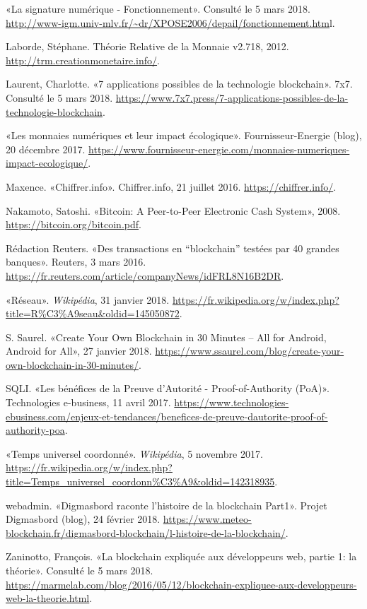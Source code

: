 \documentclass{article}
\begin{document}
«La signature numérique - Fonctionnement». Consulté le 5 mars 2018. \url{http://www-igm.univ-mlv.fr/~dr/XPOSE2006/depail/fonctionnement.htm}l.

Laborde, Stéphane. Théorie Relative de la Monnaie v2.718, 2012. \url{http://trm.creationmonetaire.info/}.

Laurent, Charlotte. «7 applications possibles de la technologie blockchain». 7x7. Consulté le 5 mars 2018. \url{https://www.7x7.press/7-applications-possibles-de-la-technologie-blockchain}.

«Les monnaies numériques et leur impact écologique». Fournisseur-Energie (blog), 20 décembre 2017. \url{https://www.fournisseur-energie.com/monnaies-numeriques-impact-ecologique/}.

Maxence. «Chiffrer.info». Chiffrer.info, 21 juillet 2016. \url{https://chiffrer.info/}.

Nakamoto, Satoshi. «Bitcoin: A Peer-to-Peer Electronic Cash System», 2008. \url{https://bitcoin.org/bitcoin.pdf}.

Rédaction Reuters. «Des transactions en “blockchain” testées par 40 grandes banques». Reuters, 3 mars 2016. \url{https://fr.reuters.com/article/companyNews/idFRL8N16B2DR}.

«Réseau». \textit{Wikipédia}, 31 janvier 2018. \url{https://fr.wikipedia.org/w/index.php?title=R\%C3\%A9seau&oldid=145050872}.

S. Saurel. «Create Your Own Blockchain in 30 Minutes – All for Android, Android for All», 27 janvier 2018. \url{https://www.ssaurel.com/blog/create-your-own-blockchain-in-30-minutes/}.

SQLI. «Les bénéfices de la Preuve d’Autorité - Proof-of-Authority (PoA)». Technologies e-business, 11 avril 2017. \url{https://www.technologies-ebusiness.com/enjeux-et-tendances/benefices-de-preuve-dautorite-proof-of-authority-poa}.

«Temps universel coordonné». \textit{Wikipédia}, 5 novembre 2017. \url{https://fr.wikipedia.org/w/index.php?title=Temps_universel_coordonn\%C3\%A9&oldid=142318935}.

webadmin. «Digmasbord raconte l’histoire de la blockchain Part1». Projet Digmasbord (blog), 24 février 2018. \url{https://www.meteo-blockchain.fr/digmasbord-blockchain/l-histoire-de-la-blockchain/}.

Zaninotto, François. «La blockchain expliquée aux développeurs web, partie 1: la théorie». Consulté le 5 mars 2018. \url{https://marmelab.com/blog/2016/05/12/blockchain-expliquee-aux-developpeurs-web-la-theorie.html}.
\end{document}
